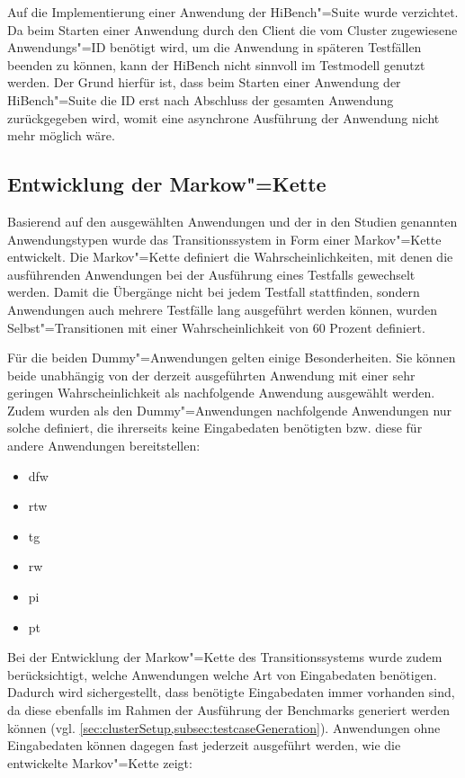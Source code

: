 Auf die Implementierung einer Anwendung der HiBench"=Suite wurde verzichtet.
Da beim Starten einer Anwendung durch den Client die vom Cluster zugewiesene Anwendungs"=ID benötigt wird, um die Anwendung in späteren Testfällen beenden zu können, kann der HiBench nicht sinnvoll im Testmodell genutzt werden.
Der Grund hierfür ist, dass beim Starten einer Anwendung der HiBench"=Suite die ID erst nach Abschluss der gesamten Anwendung zurückgegeben wird, womit eine asynchrone Ausführung der Anwendung nicht mehr möglich wäre.

\subsection{Entwicklung der Markow"=Kette}
\label{subsec:markovChain}

Basierend auf den ausgewählten Anwendungen und der in den Studien genannten Anwendungstypen wurde das Transitionssystem in Form einer Markov"=Kette entwickelt.
Die Markov"=Kette definiert die Wahrscheinlichkeiten, mit denen die ausführenden Anwendungen bei der Ausführung eines Testfalls gewechselt werden.
Damit die Übergänge nicht bei jedem Testfall stattfinden, sondern Anwendungen auch mehrere Testfälle lang ausgeführt werden können, wurden Selbst"=Transitionen mit einer Wahrscheinlichkeit von 60 Prozent definiert.

Für die beiden Dummy"=Anwendungen gelten einige Besonderheiten.
Sie können beide unabhängig von der derzeit ausgeführten Anwendung mit einer sehr geringen Wahrscheinlichkeit als nachfolgende Anwendung ausgewählt werden.
Zudem wurden als den Dummy"=Anwendungen nachfolgende Anwendungen nur solche definiert, die ihrerseits keine Eingabedaten benötigten bzw. diese für andere Anwendungen bereitstellen:

\begin{itemize}
    \item \acrlong{dfw}
    \item \acrlong{rtw}
    \item \acrlong{tg}
    \item \acrlong{rw}
    \item \acrlong{pi}
    \item \acrlong{pt}
\end{itemize}

Bei der Entwicklung der Markow"=Kette des Transitionssystems wurde zudem berücksichtigt, welche Anwendungen welche Art von Eingabedaten benötigen.
Dadurch wird sichergestellt, dass benötigte Eingabedaten immer vorhanden sind, da diese ebenfalls im Rahmen der Ausführung der Benchmarks generiert werden können (vgl. \cref{sec:clusterSetup,subsec:testcaseGeneration}).
Anwendungen ohne Eingabedaten können dagegen fast jederzeit ausgeführt werden, wie die entwickelte Markov"=Kette zeigt:

